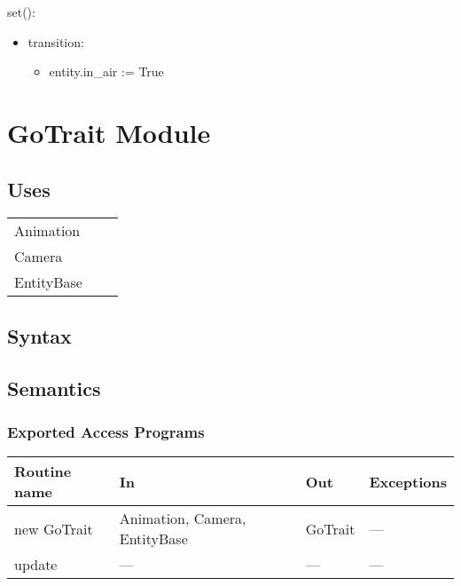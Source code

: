 \documentclass[12pt]{article}
\begin{document}
set():
\begin{itemize}
    \item transition: 
    \begin{itemize}[]
        \item entity.in\_air := True
    \end{itemize}
\end{itemize}

\newpage

\section*{GoTrait Module}

\subsection* {Uses}

\begin{tabular}{lll}
    Animation & & \\
    Camera & & \\
    EntityBase & & \\
\end{tabular}

\subsection* {Syntax}

\subsection* {Semantics}

\subsubsection* {Exported Access Programs}

\begin{tabular}{| l | l | l | l |}
\hline
\textbf{Routine name} & \textbf{In} & \textbf{Out} & \textbf{Exceptions}\\
\hline
new GoTrait & Animation, Camera, EntityBase & GoTrait & ---\\
\hline
update & --- & --- & ---\\
\hline
\end{tabular}
\end{document}

